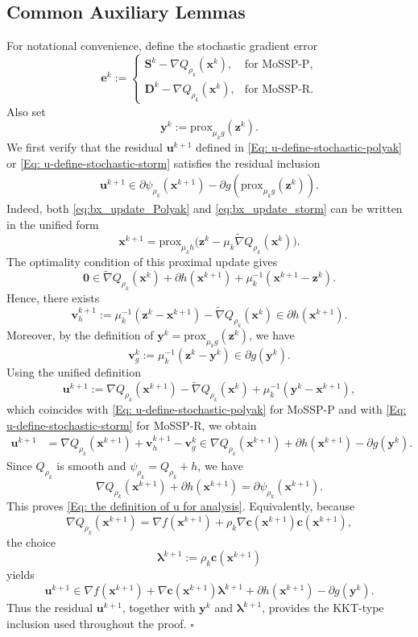 \documentclass{article}
\theoremstyle{plain}
\theoremstyle{definition}
\theoremstyle{remark}
\newcommand{\zero}{\bm{0}}
\newcommand{\prox}{\mathrm{prox}}
\newcommand{\bx}{\bm{x}}
\newcommand{\bc}{\bm{c}}
\newcommand{\be}{\bm{e}}
\newcommand{\bu}{\bm{u}}
\newcommand{\bz}{\bm{z}}
\newcommand{\by}{\bm{y}}
\newcommand{\bD}{\bm{D}}
\newcommand{\bv}{\bm{v}}
\newcommand{\bS}{\bm{S}}
\newcommand{\blambda}{\bm{\lambda}}
\newcommand{\eproof}{\hfill $\square$}
\numberwithin{equation}{section}
\begin{document}
\subsection{{Common Auxiliary Lemmas}}
\label{Subsection: auxiliary lemmas}
For notational convenience, define the stochastic gradient error
\begin{equation}
\label{Eq: the stochastic error}
\be^k :=
\begin{cases}
    \bS^k-\nabla Q_{\rho_k}(\bx^k), & \text{for MoSSP-P},\\
    \bD^k-\nabla Q_{\rho_k}(\bx^k), & \text{for MoSSP-R}.
\end{cases}
\end{equation}
Also set
\[
    \by^k:=\prox_{\mu_k g}(\bz^k).
\]
We first verify that the residual \(\bu^{k+1}\) defined in
\eqref{Eq: u-define-stochastic-polyak} or
\eqref{Eq: u-define-stochastic-storm} satisfies the residual inclusion
\begin{align}
    \bu^{k+1} \in \partial \psi_{\rho_k}(\bx^{k+1}) - \partial g(\prox_{\mu_k g}(\bz^k)).
    \label{Eq: the definition of u for analysis}
\end{align}
Indeed, both \eqref{eq:bx_update_Polyak} and
\eqref{eq:bx_update_storm} can be written in the unified form
\[
    \bx^{k+1}
    =
    \prox_{\mu_k h}
    \bigl(\bz^k-\mu_k \tilde{\nabla} Q_{\rho_k}(\bx^k) \bigr).
\]
The optimality condition of this proximal update gives
\[
    \zero
    \in
    \tilde{\nabla} Q_{\rho_k}(\bx^k)
    +\partial h(\bx^{k+1})
    +\mu_k^{-1}(\bx^{k+1}-\bz^k).
\]
Hence, there exists
\[
    \bv_h^{k+1}
    :=
    \mu_k^{-1}(\bz^k-\bx^{k+1})
    -
    \tilde{\nabla} Q_{\rho_k}(\bx^k)
    \in
    \partial h(\bx^{k+1}).
\]
Moreover, by the definition of \(\by^k=\prox_{\mu_k g}(\bz^k)\), we have
\[
    \bv_g^k
    :=
    \mu_k^{-1}(\bz^k-\by^k)
    \in
    \partial g(\by^k).
\]
Using the unified definition
\[
    \bu^{k+1}
    :=
    \nabla Q_{\rho_k}(\bx^{k+1})
    -
    \tilde{\nabla} Q_{\rho_k}(\bx^k)
    +
    \mu_k^{-1}(\by^k-\bx^{k+1}),
\]
which coincides with \eqref{Eq: u-define-stochastic-polyak} for MoSSP-P
and with \eqref{Eq: u-define-stochastic-storm} for MoSSP-R, we obtain
\[
\begin{aligned}
    \bu^{k+1}
    &=
    \nabla Q_{\rho_k}(\bx^{k+1})
    +
    \bv_h^{k+1}
    -
    \bv_g^k   \in
    \nabla Q_{\rho_k}(\bx^{k+1})
    +
    \partial h(\bx^{k+1})
    -
    \partial g(\by^k).
\end{aligned}
\]
Since \(Q_{\rho_k}\) is smooth and
\(\psi_{\rho_k}=Q_{\rho_k}+h\), we have
\[
    \nabla Q_{\rho_k}(\bx^{k+1})
    +
    \partial h(\bx^{k+1})
    =
    \partial\psi_{\rho_k}(\bx^{k+1}).
\]
This proves \eqref{Eq: the definition of u for analysis}. Equivalently,
because
\[
    \nabla Q_{\rho_k}(\bx^{k+1})
    =
    \nabla f(\bx^{k+1})
    +
    \rho_k\nabla\bc(\bx^{k+1})\bc(\bx^{k+1}),
\]
the choice
\[
    \blambda^{k+1}:=\rho_k\bc(\bx^{k+1})
\]
yields
\[
\bu^{k+1}
\in
\nabla f(\bx^{k+1})
+
\nabla\bc(\bx^{k+1})\blambda^{k+1}
+
\partial h(\bx^{k+1})
-
\partial g(\by^k).
\]
Thus the residual \(\bu^{k+1}\), together with
\(\by^k\) and \(\blambda^{k+1}\), provides the KKT-type inclusion used
throughout the proof. \eproof
\end{document}
